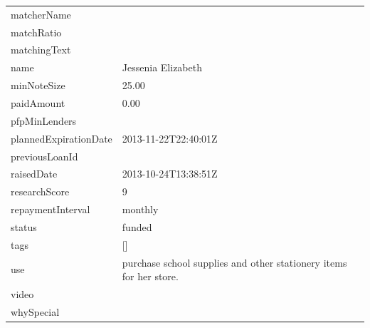 \begin{longtable}{|p{}|p{}|}
	matcherName                          &                                                                     \\
	matchRatio                           &                                                                     \\
	matchingText                         &                                                                     \\
	name                                 & Jessenia Elizabeth                                                  \\
	minNoteSize                          & 25.00                                                               \\
	paidAmount                           & 0.00                                                                \\
	pfpMinLenders                        &                                                                     \\
	plannedExpirationDate                & 2013-11-22T22:40:01Z                                                \\
	previousLoanId                       &                                                                     \\
	raisedDate                           & 2013-10-24T13:38:51Z                                                \\
	researchScore                        & 9                                                                   \\
	repaymentInterval                    & monthly                                                             \\
	status                               & funded                                                              \\
	tags                                 & {[}{]}                                                              \\
	use                                  & purchase school supplies and other stationery items for her
	store.                                                                                                     \\
	video                                &                                                                     \\
	whySpecial                           &                                                                     \\

\end{longtable}
